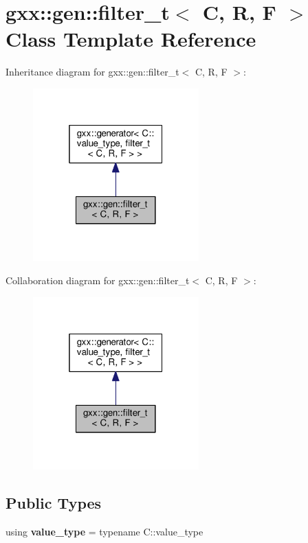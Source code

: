 \hypertarget{classgxx_1_1gen_1_1filter__t}{}\section{gxx\+:\+:gen\+:\+:filter\+\_\+t$<$ C, R, F $>$ Class Template Reference}
\label{classgxx_1_1gen_1_1filter__t}


Inheritance diagram for gxx\+:\+:gen\+:\+:filter\+\_\+t$<$ C, R, F $>$\+:\nopagebreak
\begin{figure}[H]
\begin{center}
\leavevmode
\includegraphics[width=181pt]{classgxx_1_1gen_1_1filter__t__inherit__graph}
\end{center}
\end{figure}


Collaboration diagram for gxx\+:\+:gen\+:\+:filter\+\_\+t$<$ C, R, F $>$\+:\nopagebreak
\begin{figure}[H]
\begin{center}
\leavevmode
\includegraphics[width=181pt]{classgxx_1_1gen_1_1filter__t__coll__graph}
\end{center}
\end{figure}
\subsection*{Public Types}
\begin{DoxyCompactItemize}
\item 
using {\bfseries value\+\_\+type} = typename C\+::value\+\_\+type\hypertarget{classgxx_1_1gen_1_1filter__t_a05ea7c783b25880156b69c921b7a79f4}{}\label{classgxx_1_1gen_1_1filter__t_a05ea7c783b25880156b69c921b7a79f4}

\end{DoxyCompactItemize}
